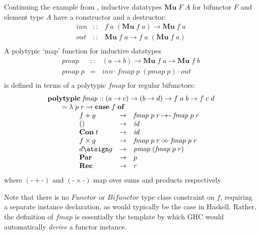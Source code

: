 \documentclass[fleqn,runningheads]{llncs}
\def\sumf{\mathbin{\mbox{-}{+}\mbox{-}}}
\def\prodf{\mathbin{\mbox{-}{\!\times\!}\mbox{-}}}
\begin{document}
Continuing the example from \cite{Jeuring&Jansson96:Polytypic}, inductive datatypes $\mathbf{Mu}\;F\;A$ for bifunctor $F$ and element type $A$ have a constructor and a destructor:
\[ \begin{array}{lcl}
\mathit{inn} &::& f\;a\;(\mathbf{Mu}\;f\;a) \to \mathbf{Mu}\;f\;a \\
\mathit{out} &::& \mathbf{Mu}\;f\;a \to f\;a\;(\mathbf{Mu}\;f\;a) \\
\end{array} \]
A polytypic `map' function for inductive datatypes
\[ \begin{array}{lcl}
\mathit{pmap} &::& (a \to b) \to \mathbf{Mu}\;f\;a \to \mathbf{Mu}\;f\;b \\
\mathit{pmap}\;p &=& \mathit{inn} \mathbin{\cdot} \mathit{fmap}\;p\;(\mathit{pmap}\;p) \mathbin{\cdot} \mathit{out} \\
\end{array} \]
is defined in terms of a polytypic $\mathit{fmap}$ for regular bifunctors:
\[ \begin{array}{l}
\mathbf{polytypic}\;\mathit{fmap} :: (a \to c) \to (b \to d) \to f\;a\;b \to f\;c\;d \\
\qquad = \lambda\;p\;r \rightarrow \mathbf{case}\;f\;\mathbf{of} \\
\qquad \qquad \begin{array}[t]{lcl}
f + g &\rightarrow& \mathit{fmap}\;p\;r \sumf \mathit{fmap}\;p\;r \\
() &\rightarrow& \mathit{id} \\
\mathbf{Con}\;t &\rightarrow& \mathit{id} \\
f \times g &\rightarrow&\mathit{fmap}\;p\;r \prodf \mathit{fmap}\;p\;r \\
d \atsign g &\rightarrow& \mathit{pmap}\;(\mathit{fmap}\;p\;r) \\
\mathbf{Par} &\rightarrow& p \\
\mathbf{Rec} &\rightarrow& r \\
\end{array}
\end{array} \]
where $(\sumf)$ and $(\prodf)$ map over sums and products respectively.

Note that there is no $\mathit{Functor}$ or $\mathit{Bifunctor}$ type class constraint on $f$, requiring a separate instance declaration, as would typically be the case in Haskell. Rather, the definition of $\mathit{fmap}$ is essentially the template by which GHC would automatically \emph{derive} a functor instance.
\end{document}
